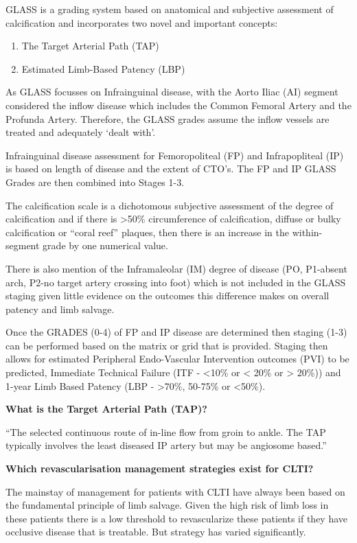 \documentclass[
]{book}
\begin{document}
GLASS is a grading system based on anatomical and subjective assessment
of calcification and incorporates two novel and important concepts:

\begin{enumerate}
\def\labelenumi{\arabic{enumi}.}
\item
  The Target Arterial Path (TAP)
\item
  Estimated Limb-Based Patency (LBP)
\end{enumerate}

As GLASS focusses on Infrainguinal disease, with the Aorto Iliac (AI)
segment considered the inflow disease which includes the Common Femoral
Artery and the Profunda Artery. Therefore, the GLASS grades assume the
inflow vessels are treated and adequately `dealt with'.~

Infrainguinal disease assessment for Femoropoliteal (FP) and
Infrapopliteal (IP) is based on length of disease and the extent of
CTO's. The FP and IP GLASS Grades are then combined into Stages 1-3.~

The calcification scale is a dichotomous subjective assessment of the
degree of calcification and if there is \textgreater50\% circumference of
calcification, diffuse or bulky calcification or ``coral reef'' plaques,
then there is an increase in the within-segment grade by one numerical
value.

There is also mention of the Inframaleolar (IM) degree of disease (PO,
P1-absent arch, P2-no target artery crossing into foot) which is not
included in the GLASS staging given little evidence on the outcomes this
difference makes on overall patency and limb salvage.

Once the GRADES (0-4) of FP and IP disease are determined then staging
(1-3) can be performed based on the matrix or grid that is provided.
Staging then allows for estimated Peripheral Endo-Vascular Intervention
outcomes (PVI) to be predicted, Immediate Technical Failure (ITF - \textless10\%
or \textless{} 20\% or \textgreater{} 20\%)) and 1-year Limb Based Patency (LBP - \textgreater70\%, 50-75\%
or \textless50\%).~

\textbf{What is the Target Arterial Path (TAP)?}

``The selected continuous route of in-line flow from groin to ankle. The
TAP typically involves the least diseased IP artery but may be angiosome
based.''

\textbf{Which revascularisation management strategies exist for CLTI?}

The mainstay of management for patients with CLTI have always been
based on the fundamental principle of limb salvage. Given the high
risk of limb loss in these patients there is a low threshold to
revascularize these patients if they have occlusive disease that is
treatable. But strategy has varied significantly.
\end{document}
